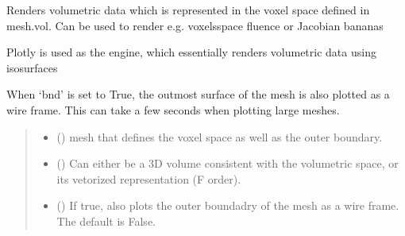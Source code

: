 \documentclass[letterpaper,10pt,english]{sphinxmanual}
\begin{document}
\begin{fulllineitems}
\label{\detokenize{_autosummary/nirfasterff.visualize.plotvol:nirfasterff.visualize.plotvol}}
\pysigstartsignatures
\pysiglinewithargsret
{}
{\sphinxparamcomma {}\sphinxparamcomma {}\sphinxparamcomma {}\sphinxparamcomma {}\sphinxparamcomma {}\sphinxparamcomma {}}
{}
\pysigstopsignatures
\sphinxAtStartPar
Renders volumetric data which is represented in the voxel space defined in mesh.vol.
Can be used to render e.g. voxels\sphinxhyphen{}space fluence or Jacobian bananas

\sphinxAtStartPar
Plotly is used as the engine, which essentially renders volumetric data using isosurfaces

\sphinxAtStartPar
When ‘bnd’ is set to True, the outmost surface of the mesh is also plotted as a wire frame.
This can take a few seconds when plotting large meshes.
\begin{quote}\begin{description}
\begin{itemize}
\item {} 
\sphinxAtStartPar
{} () \textendash{} mesh that defines the voxel space as well as the outer boundary.

\item {} 
\sphinxAtStartPar
{} () \textendash{} Can either be a 3D volume consistent with the volumetric space, or its vetorized representation (F order).

\item {} 
\sphinxAtStartPar
{} (\sphinxstyleliteralemphasis{\sphinxupquote{, }}) \textendash{} If true, also plots the outer boundadry of the mesh as a wire frame. The default is False.


\end{itemize}
\end{description}
\end{quote}
\end{fulllineitems}
\end{document}
